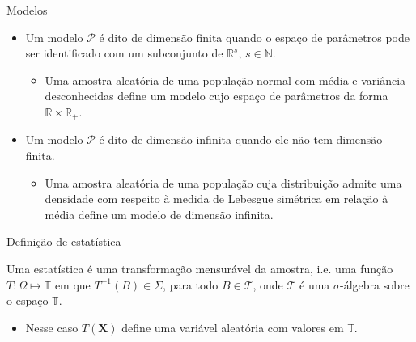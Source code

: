 \documentclass[11pt]{beamer}
\newenvironment{halfwideitemize}{\itemize\addtolength{\itemsep}{0.5em}}{\enditemize}
\begin{document}
	
	\begin{frame}{Modelos}
	\begin{itemize}
		\item Um modelo $\mathcal{P}$ é dito de {\color{blue}dimensão finita} quando o espaço de parâmetros pode ser identificado com um subconjunto de $\mathbb{R}^s$, $ s\in \mathbb{N}$.
		\begin{itemize}
			\item Uma amostra aleatória de uma população normal com média e variância desconhecidas define um modelo cujo espaço de parâmetros da forma $\mathbb{R}\times \mathbb{R}_+$.
		\end{itemize}
				\item Um modelo $\mathcal{P}$ é dito de {\color{blue}dimensão infinita} quando ele não tem dimensão finita.
		\begin{itemize}
			\item Uma amostra aleatória de uma população cuja distribuição admite uma densidade com respeito à medida de Lebesgue simétrica em relação à média define um modelo de dimensão infinita.
		\end{itemize}
		
	\end{itemize}
	\end{frame}
	\begin{frame}{Definição de estatística}
		\begin{halfwideitemize}
			
			\item Uma {\color{blue}estatística} é uma transformação mensurável da amostra, i.e. uma função $T:\Omega \mapsto \mathbb{T}$ em que $T^{-1}(B) \in \Sigma$,  para todo  $B \in \mathcal{T}$, onde $\mathcal{T}$ é uma $\sigma$-álgebra sobre o espaço $\mathbb{T}$.
			\begin{itemize}
				\item Nesse caso $T(\boldsymbol{X})$ define uma variável aleatória com valores em $\mathbb{T}$.
			\end{itemize}
		
		\end{halfwideitemize}
	\end{frame}
	
\end{document}
